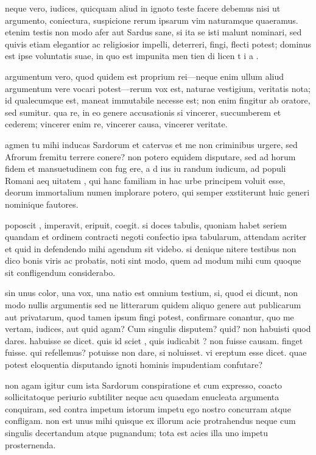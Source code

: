  neque vero, iudices, quicquam aliud in ignoto teste facere debemus nisi ut argumento, coniectura, suspicione rerum ipsarum vim naturamque quaeramus. etenim testis non modo afer aut Sardus sane, si ita se isti malunt nominari, sed quivis etiam elegantior ac religiosior impelli, deterreri, fingi, flecti potest; dominus est ipse voluntatis suae, in quo est impunita men tien di licen t i a .

 argumentum vero, quod quidem est proprium rei—neque enim ullum aliud argumentum vere vocari potest—rerum vox est, naturae vestigium, veritatis nota; id qualecumque est, maneat immutabile necesse est; non enim fingitur ab oratore, sed sumitur. qua re, in eo genere accusationis si vincerer, succumberem et cederem; vincerer enim re, vincerer causa, vincerer veritate.

 agmen tu mihi inducas Sardorum et catervas et me non criminibus urgere, sed Afrorum fremitu terrere conere? non potero equidem disputare, sed ad horum fidem et mansuetudinem con fug ere, a d ius iu randum iudicum, ad populi Romani aeq uitatem , qui hanc familiam in hac urbe principem voluit esse, deorum immortalium numen implorare potero, qui semper exstiterunt huic generi nominique fautores.

 poposcit , imperavit, eripuit, coegit. si doces tabulis, quoniam habet seriem quandam et ordinem contracti negoti confectio ipsa tabularum, attendam acriter et quid in defendendo mihi agendum sit videbo. si denique nitere testibus non dico bonis viris ac probatis, noti sint modo, quem ad modum mihi cum quoque sit confligendum considerabo.

 sin unus color, una vox, una natio est omnium testium, si, quod ei dicunt, non modo nullis argumentis sed ne litterarum quidem aliquo genere aut publicarum aut privatarum, quod tamen ipsum fingi potest, confirmare conantur, quo me vertam, iudices, aut quid agam? Cum singulis disputem? quid? non habuisti quod dares. habuisse se dicet. quis id sciet , quis iudicabit ? non fuisse causam. finget fuisse. qui refellemus? potuisse non dare, si noluisset. vi ereptum esse dicet. quae potest eloquentia disputando ignoti hominis impudentiam confutare?

 non agam igitur cum ista Sardorum conspiratione et cum expresso, coacto sollicitatoque periurio subtiliter neque acu quaedam enucleata argumenta conquiram, sed contra impetum istorum impetu ego nostro concurram atque confligam. non est unus mihi quisque ex illorum acie protrahendus neque cum singulis decertandum atque pugnandum; tota est acies illa uno impetu prosternenda.

